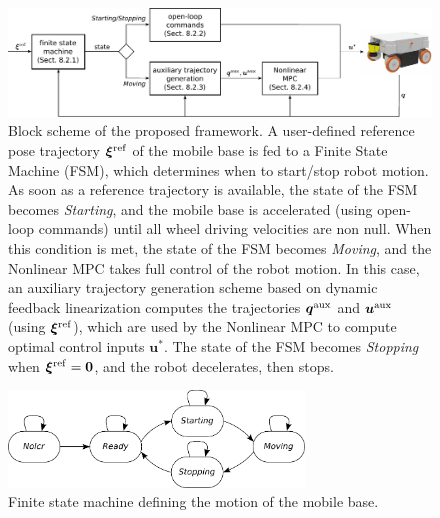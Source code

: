 \begin{figure}
    \centering
    \includegraphics[width=\textwidth]{figures/SWMR/blockscheme.pdf}
    \caption{Block scheme of the proposed framework. A user-defined reference
        pose trajectory $\bm{\xi}^{\rm ref}$ of the mobile base is fed to a
        Finite State Machine (FSM), which determines when to start/stop robot
        motion. As soon as a reference trajectory is available, the state of
        the FSM becomes \textit{Starting}, and the mobile base is accelerated
        (using open-loop commands) until all wheel driving velocities are non
        null. When this condition is met, the state of the FSM becomes
        \textit{Moving}, and the Nonlinear MPC takes full control of the
        robot motion. In this case, an auxiliary trajectory generation scheme
        based on dynamic feedback linearization computes the trajectories
        $\bm{q}^{\rm aux}$ and $\bm{u}^{\rm aux}$ (using $\bm{\xi}^{\rm ref}$),
        which are used by the Nonlinear MPC to compute optimal control inputs
        $\bm{u}^*$. The state of the FSM becomes \textit{Stopping} when
        $\bm{\xi}^{\rm ref} = \bm{0}$, and the robot decelerates, then stops.
    }
    \label{fig:block-scheme}
\end{figure}

\begin{figure}
    \centering
    \includegraphics[width=0.7\textwidth]{figures/SWMR/finitestatemachine.pdf}
    \caption{Finite state machine defining the motion of the mobile base.}
    \label{fig:finite-state-machine}
\end{figure}



